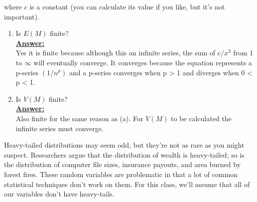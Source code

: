 \documentclass[12pt,a4paper]{article}
\numberwithin{equation}{subsection}
\begin{document}
\begin{enumerate}
where $c$ is a constant (you can calculate its value if you like, but it's not important).

\begin{enumerate}
\item Is $E(M)$ finite?
\\
\textbf{\underline{Answer:}}
\\
Yes it is finite because although this an infinite series, the sum of $c/x^3$ from 1 to $\infty$ will eventually converge.  It converges because the equation represents a p-series $(1/n^p)$ and a p-series converges when p > 1 and diverges when 0 < p < 1.

\item Is $V(M)$ finite?
\\
\textbf{\underline{Answer:}}
\\
Also finite for the same reason as (a). For $V(M)$ to be calculated the infinite series must converge.

\end{enumerate}

Heavy-tailed distributions may seem odd, but they're not as rare as you might suspect.  Researchers argue that the distribution of wealth is heavy-tailed; so is the distribution of computer file sizes, insurance payouts, and area burned by forest fires.  These random variables are problematic in that a lot of common statistical techniques don't work on them.  For this class, we'll assume that all of our variables don't have heavy-tails.

\end{enumerate}
\end{document}
